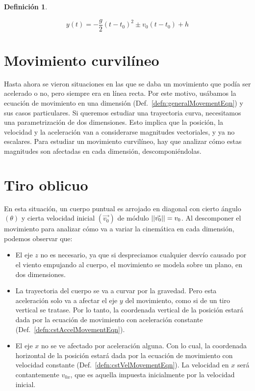 \documentclass[a5paper,12pt,twoside]{book}
\newtheorem{defn}{{Definición}}[chapter]
\begin{document}
\begin{mdframed}[style=MyFrame1]
    \begin{defn}
    \end{defn}
    \begin{equation*}
        y(t) = -\frac{g}{2}(t-t_0)^2 \pm v_0(t-t_0) + h
    \end{equation*}
\end{mdframed}


\section{Movimiento curvilíneo}

Hasta ahora se vieron situaciones en las que se daba un movimiento que podía ser acelerado o no, pero siempre era en línea recta. Por este motivo, usábamos la ecuación de movimiento en una dimensión (Def.\ \ref{defn:generalMovementEqn}) y sus casos particulares. Si queremos estudiar una trayectoria curva, necesitamos una parametrización de dos dimensiones. Esto implica que la posición, la velocidad y la aceleración van a considerarse magnitudes vectoriales, y ya no escalares. Para estudiar un movimiento curvilíneo, hay que analizar cómo estas magnitudes son afectadas en cada dimensión, descomponiéndolas.


\section{Tiro oblicuo}
\label{subsec:parabolicMotion}

En esta situación, un cuerpo puntual es arrojado en diagonal con cierto ángulo $(\theta)$ y cierta velocidad inicial $(\Vec{v_0})$ de módulo ${\left|\left| {\Vec{v_0}} \right|\right|} = v_0$. Al descomponer el movimiento para analizar cómo va a variar la cinemática en cada dimensión, podemos observar que:
\begin{itemize}
    \item El eje $z$ no es necesario, ya que si despreciamos cualquier desvío causado por el viento empujando al cuerpo, el movimiento se modela sobre un plano, en dos dimensiones.
    
    \item La trayectoria del cuerpo se va a curvar por la gravedad. Pero esta aceleración solo va a afectar el eje $y$ del movimiento, como si de un tiro vertical se tratase. Por lo tanto, la coordenada vertical de la posición estará dada por la ecuación de movimiento con aceleración constante (Def.\ \ref{defn:cstAccelMovementEqn}).
    
    \item El eje $x$ no se ve afectado por aceleración alguna. Con lo cual, la coordenada horizontal de la posición estará dada por la ecuación de movimiento con velocidad constante (Def.\ \ref{defn:cstVelMovementEqn}). La velocidad en $x$ será contantemente $v_{0x}$, que es aquella impuesta inicialmente por la velocidad inicial.
\end{itemize}
\end{document}
